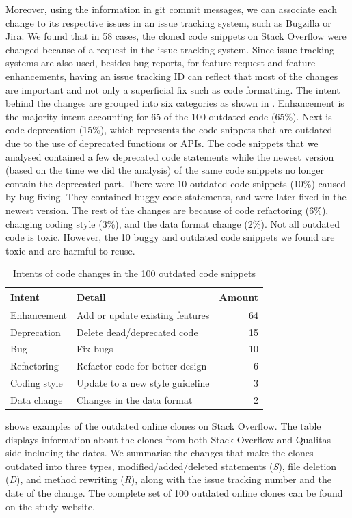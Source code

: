 \documentclass[10pt,journal,compsoc]{IEEEtran}
\begin{document}
Moreover, using the information in git commit messages, we can associate each
change to its respective issues in an issue tracking system, such as Bugzilla or
Jira. We found that in 58 cases, the cloned code snippets on Stack Overflow were
changed because of a request in the issue tracking system. Since issue tracking
systems are also used, besides bug reports, for feature request and feature
enhancements, having an issue tracking ID can reflect that most of the changes are important
and not only a superficial fix such as code formatting. The intent behind
the changes are grouped into six categories as shown in .
Enhancement is the majority intent accounting for 65 of the 100 outdated code (65\%). 
Next is code deprecation (15\%), which represents the code snippets that are outdated due to the use of
deprecated functions or APIs. The code snippets that we analysed contained a few deprecated code statements while
the newest version (based on the time we did the analysis) of the same code
snippets no longer contain the deprecated part.
There were 10 outdated code snippets (10\%) caused by bug fixing.
They contained buggy code statements, and were later fixed in the newest version.
The rest of the changes are because of code refactoring (6\%), changing coding style (3\%), and 
the data format change (2\%).
Not all outdated code is toxic. 
However, the 10 buggy and outdated code snippets we found are toxic and are harmful to reuse.

\begin{table}
	\centering
	\caption{Intents of code changes in the 100 outdated code snippets}
	\label{tab:intent_outdated}
	\begin{tabular}{llr}
		\toprule
		Intent & Detail & Amount \\
		\midrule
		Enhancement & Add or update existing features & 64 \\
		Deprecation & Delete dead/deprecated code & 15 \\
		Bug & Fix bugs & 10 \\
		Refactoring & Refactor code for better design & 6 \\
		Coding style & Update to a new style guideline & 3 \\
		Data change & Changes in the data format & 2 \\
		\bottomrule
	\end{tabular}
\end{table}


 shows examples of the outdated online clones on
Stack Overflow. The table displays information about the clones from both Stack
Overflow and Qualitas side including the dates. We summarise the changes that
make the clones outdated into three types, modified/added/deleted statements
(\textit{S}), file deletion (\textit{D}), and method rewriting (\textit{R}),
along with the issue tracking number and the date of the change. The complete set of
100 outdated online clones can be found on the study website.
\end{document}
